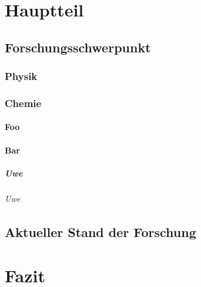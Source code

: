 \documentclass[ngerman,12pt,parskip=half]{scrreprt}
\begin{document}
\blindtext[5]



\chapter{Hauptteil}

\section{Forschungsschwerpunkt}

\blindtext[5]

\subsection{Physik}

\blindtext[5]

\subsection{Chemie}

\blindtext[5]

\subsubsection{Foo}

\blindtext[5]

\subsubsection{Bar}

\blindtext[5]

\paragraph{Uwe} \blindtext

\subparagraph{Uwe} \blindtext

\section{Aktueller Stand der Forschung}

\blindtext[5]

\chapter{Fazit}

\blindtext[25]
\end{document}
